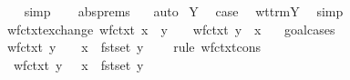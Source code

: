 \begin{isabellebody}
\ \ \isamarkupfalse%
\ simp\isanewline
\ \ \isamarkupfalse%
\ abs{\isachardot}prems{\isacharparenleft}{}{\isacharparenright}\ {}\ \isamarkupfalse%
\ auto\isanewline
{}\isamarkupfalse%
\isanewline
{}\isamarkupfalse%
\ Y\ \isamarkupfalse%
\ {\isacharquery}case\ \isamarkupfalse%
\ wt{\isacharunderscore}trm{\isachardot}Y\ \isamarkupfalse%
\ simp\isanewline
{}\isamarkupfalse%
%
\endisatagproof
{\isafoldproof}%
%
\isadelimproof
\isanewline
%
\endisadelimproof
\isanewline
{}\isamarkupfalse%
\ wf{\isacharunderscore}ctxt{\isacharunderscore}exchange{\isacharcolon}\ {\isachardoublequoteopen}wf{\isacharunderscore}ctxt\ {\isacharparenleft}{\isacharparenleft}x{\isacharcomma}{\isasymsigma}{\isacharparenright}\ {\isacharhash}\ {\isacharparenleft}y{\isacharcomma}{\isasympi}{\isacharparenright}\ {\isacharhash}\ {\isasymGamma}{\isacharparenright}\ {\isasymLongrightarrow}\ wf{\isacharunderscore}ctxt\ {\isacharparenleft}{\isacharparenleft}y{\isacharcomma}{\isasympi}{\isacharparenright}\ {\isacharhash}\ {\isacharparenleft}x{\isacharcomma}{\isasymsigma}{\isacharparenright}\ {\isacharhash}\ {\isasymGamma}{\isacharparenright}{\isachardoublequoteclose}\isanewline
%
\isadelimproof
%
\endisadelimproof
%
\isatagproof
{}\isamarkupfalse%
\ goal{\isacharunderscore}cases\isanewline
{}\isamarkupfalse%
\ {}\ \isanewline
\ \ \isamarkupfalse%
\ \isamarkupfalse%
\ {\isachardoublequoteopen}wf{\isacharunderscore}ctxt\ {\isacharparenleft}{\isacharparenleft}y{\isacharcomma}{\isasympi}{\isacharparenright}\ {\isacharhash}\ {\isasymGamma}{\isacharparenright}\ {\isasymand}\ x\ {\isasymnotin}\ fst{\isacharbackquote}set\ {\isacharparenleft}{\isacharparenleft}y{\isacharcomma}{\isasympi}{\isacharparenright}\ {\isacharhash}\ {\isasymGamma}{\isacharparenright}{\isachardoublequoteclose}\ \isamarkupfalse%
\ {\isacharparenleft}rule\ wf{\isacharunderscore}ctxt{\isacharunderscore}cons{\isacharparenright}\isanewline
\ \ \isamarkupfalse%
\ \isamarkupfalse%
\ {}{\isacharcolon}\ {\isachardoublequoteopen}wf{\isacharunderscore}ctxt\ {\isacharparenleft}{\isacharparenleft}y{\isacharcomma}{\isasympi}{\isacharparenright}\ {\isacharhash}\ {\isasymGamma}{\isacharparenright}{\isachardoublequoteclose}\ {\isachardoublequoteopen}x\ {\isasymnotin}\ fst{\isacharbackquote}set\ {\isacharparenleft}{\isacharparenleft}y{\isacharcomma}{\isasympi}{\isacharparenright}\ {\isacharhash}\ {\isasymGamma}{\isacharparenright}{\isachardoublequoteclose}\ \ \isamarkupfalse%

\end{isabellebody}
